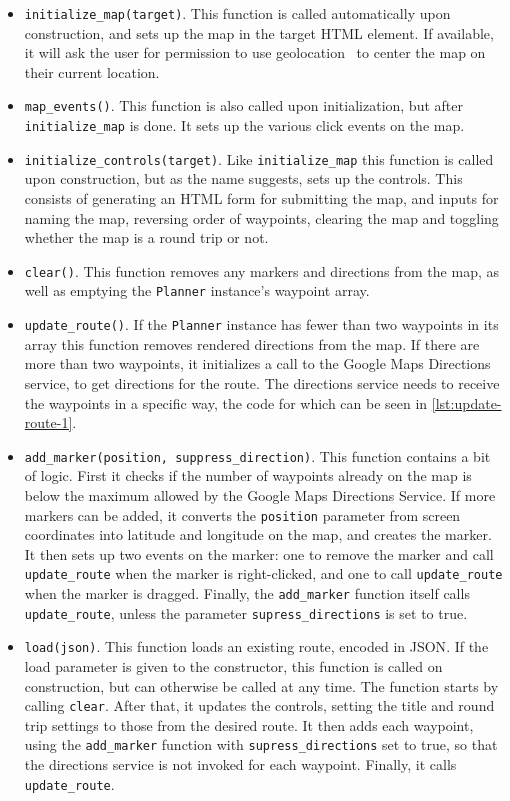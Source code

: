 \begin{itemize}
	\item{\texttt{initialize\_map(target)}. This function is called automatically upon construction, and sets up the map in the target \ac{HTML} element. If available, it will ask the user for permission to use geolocation~\citep{geolocation} to center the map on their current location.}
	\item{\texttt{map\_events()}. This function is also called upon initialization, but after \texttt{initialize\_map} is done. It sets up the various click events on the map.}
	\item{\texttt{initialize\_controls(target)}. Like \texttt{initialize\_map} this function is called upon construction, but as the name suggests, sets up the controls. This consists of generating an \ac{HTML} form for submitting the map, and inputs for naming the map, reversing order of waypoints, clearing the map and toggling whether the map is a round trip or not.}
	\item{\texttt{clear()}. This function removes any markers and directions from the map, as well as emptying the \texttt{Planner} instance's waypoint array.}
	\item{\texttt{update\_route()}. If the \texttt{Planner} instance has fewer than two waypoints in its array this function removes rendered directions from the map. If there are more than two waypoints, it initializes a call to the Google Maps Directions service, to get directions for the route. The directions service needs to receive the waypoints in a specific way, the code for which can be seen in \autoref{lst:update-route-1}.}
	\item{\texttt{add\_marker(position, suppress\_direction)}. This function contains a bit of logic. First it checks if the number of waypoints already on the map is below the maximum allowed by the Google Maps Directions Service. If more markers can be added, it converts the \texttt{position} parameter from screen coordinates into latitude and longitude on the map, and creates the marker. It then sets up two events on the marker: one to remove the marker and call \texttt{update\_route} when the marker is right-clicked, and one to call \texttt{update\_route} when the marker is dragged. Finally, the \texttt{add\_marker} function itself calls \texttt{update\_route}, unless the parameter \texttt{supress\_directions} is set to true.}
	\item{\texttt{load(json)}. This function loads an existing route, encoded in \ac{JSON}. If the load parameter is given to the constructor, this function is called on construction, but can otherwise be called at any time. The function starts by calling \texttt{clear}. After that, it updates the controls, setting the title and round trip settings to those from the desired route. It then adds each waypoint, using the \texttt{add\_marker} function with \texttt{supress\_directions} set to true, so that the directions service is not invoked for each waypoint. Finally, it calls \texttt{update\_route}.}

\end{itemize}
